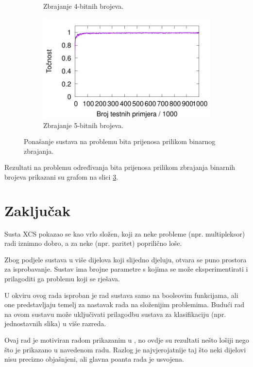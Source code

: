 \documentclass[times, utf8, zavrsni]{fer}
\begin{document}
\begin{figure}[!h]
\begin{subfigure}{0.496\textwidth}
        \caption{Zbrajanje 4-bitnih brojeva.}
        \label{fig:8care}
    \end{subfigure}
    \begin{subfigure}{0.496\textwidth}
        \centering
        \includegraphics[width=\textwidth]{img/carry/10care.pdf}
        \caption{Zbrajanje 5-bitnih brojeva.}
        \label{fig:10care}
    \end{subfigure}
    \caption{Ponašanje sustava na problemu bita prijenosa prilikom binarnog zbrajanja.}
    \label{fig:care}
\end{figure}
Rezultati na problemu određivanja bita prijenosa prilikom zbrajanja binarnih brojeva prikazani su grafom na slici \ref{fig:care}.

\chapter{Zaključak} \label{ch:zak}
Susta XCS pokazao se kao vrlo složen, koji za neke probleme (npr. multipleksor) radi iznimno dobro, a za neke (npr. paritet) poprilično loše.

Zbog podjele sustava u više dijelova koji slijedno djeluju, otvara se puno prostora za isprobavanje.
Sustav ima brojne parametre s kojima se može eksperimentirati i prilagoditi ga problemu koji se rješava.

U okviru ovog rada isproban je rad sustava samo na booleovim funkcijama, ali one predstavljaju temelj za nastavak rada na složenijim problemima.
Budući rad na ovom sustavu može uključivati prilagodbu sustava za klasifikaciju (npr. jednostavnih slika) u više razreda.

Ovaj rad je motiviran radom prikazanim u \citep{4}, no ovdje su rezultati nešto lošiji nego što je prikazano u navedenom radu.
Razlog je najvjerojatnije taj što neki dijelovi nisu precizno objašnjeni, ali glavna poanta rada je usvojena.
\end{document}
